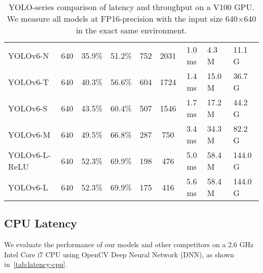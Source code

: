 \documentclass[10pt,twocolumn,letterpaper]{article}
\begin{document}
\begin{table}[ht]
{\begin{tabular}{l|HHHc|c|cHH}
      \midrule
      YOLOv6-N & 640 & 35.9\% & 51.2\% & 752 & 2031 &1.0 ms &4.3 M & 11.1 G \\
      YOLOv6-T & 640 & 40.3\% & 56.6\% & 604 & 1724 & 1.4 ms & 15.0 M & 36.7 G \\
      YOLOv6-S & 640 & 43.5\% & 60.4\% & 507 & 1546 &1.7 ms & 17.2 M & 44.2 G \\
      YOLOv6-M & 640 & 49.5\% & 66.8\%& 287 & 750 &3.4 ms & 34.3 M & 82.2 G \\
      YOLOv6-L-ReLU & 640 & 52.3\% & 69.9\% & 198  & 476 & 5.0 ms & 58.4 M & 144.0 G \\
      YOLOv6-L & 640 & 52.3\% & 69.9\% & 175  & 416 & 5.6 ms & 58.4 M & 144.0 G \\
      \bottomrule
		\end{tabular}
	}
	\caption{
    YOLO-series comparison of latency and throughput on a V100 GPU. We measure all models at FP16-precision with the input size 640$\times$640 in the exact same environment.
	}
	\label{tab:latency-qps-v100}
\end{table}

\subsection{CPU Latency}
We evaluate the performance of our models and other competitors on a 2.6 GHz  Intel Core i7 CPU using OpenCV Deep Neural Network (DNN), as shown in~\cref{tab:latency-cpu}.
\end{document}
